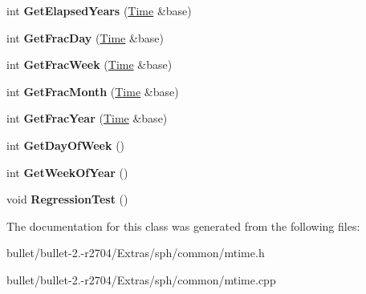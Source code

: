 \begin{DoxyCompactItemize}
\item 
\hypertarget{classmint_1_1_time_a3836c28703ec461d93cc4adbf787f3fe}{int {\bfseries Get\+Elapsed\+Years} (\hyperlink{classmint_1_1_time}{Time} \&base)}\label{classmint_1_1_time_a3836c28703ec461d93cc4adbf787f3fe}

\item 
\hypertarget{classmint_1_1_time_a29a1f04fc81babde492d75798faf9684}{int {\bfseries Get\+Frac\+Day} (\hyperlink{classmint_1_1_time}{Time} \&base)}\label{classmint_1_1_time_a29a1f04fc81babde492d75798faf9684}

\item 
\hypertarget{classmint_1_1_time_aff17b2e92d58e9012f2af6f586231b73}{int {\bfseries Get\+Frac\+Week} (\hyperlink{classmint_1_1_time}{Time} \&base)}\label{classmint_1_1_time_aff17b2e92d58e9012f2af6f586231b73}

\item 
\hypertarget{classmint_1_1_time_a6e089ba103dfb20500840dedb433ec94}{int {\bfseries Get\+Frac\+Month} (\hyperlink{classmint_1_1_time}{Time} \&base)}\label{classmint_1_1_time_a6e089ba103dfb20500840dedb433ec94}

\item 
\hypertarget{classmint_1_1_time_aa7e75d6218c70d58a7d94e682d454113}{int {\bfseries Get\+Frac\+Year} (\hyperlink{classmint_1_1_time}{Time} \&base)}\label{classmint_1_1_time_aa7e75d6218c70d58a7d94e682d454113}

\item 
\hypertarget{classmint_1_1_time_adff142369f9372e341dbdc7b3eff9e20}{int {\bfseries Get\+Day\+Of\+Week} ()}\label{classmint_1_1_time_adff142369f9372e341dbdc7b3eff9e20}

\item 
\hypertarget{classmint_1_1_time_a4aa45fbb1aa43067c4e51fad81ac9871}{int {\bfseries Get\+Week\+Of\+Year} ()}\label{classmint_1_1_time_a4aa45fbb1aa43067c4e51fad81ac9871}

\item 
\hypertarget{classmint_1_1_time_ab60039ceb0fb285b491dcec70b83abff}{void {\bfseries Regression\+Test} ()}\label{classmint_1_1_time_ab60039ceb0fb285b491dcec70b83abff}

\end{DoxyCompactItemize}


The documentation for this class was generated from the following files\+:\begin{DoxyCompactItemize}
\item 
bullet/bullet-\/2.-\/r2704/\+Extras/sph/common/mtime.\+h\item 
bullet/bullet-\/2.-\/r2704/\+Extras/sph/common/mtime.\+cpp\end{DoxyCompactItemize}
